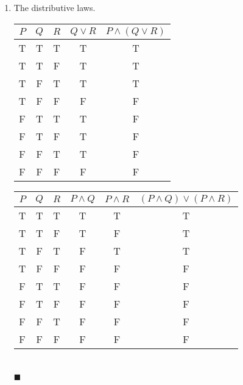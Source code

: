 \documentclass{report}
\newcommand{\qed}{‎\\‎\hfill$\blacksquare$\vspace{1em}}
\begin{document}
\begin{enumerate}[leftmargin=*]
\begin{enumerate}
              \item The distributive laws.
                    \begin{center}
                        \begin{tabular}{ccccc}
                            $P$ & $Q$ & $R$ & $Q \vee R$ & $P \wedge(Q \vee R)$ \\
                            \hline
                            T   & T   & T   & T          & T                    \\
                            T   & T   & F   & T          & T                    \\
                            T   & F   & T   & T          & T                    \\
                            T   & F   & F   & F          & F                    \\
                            F   & T   & T   & T          & F                    \\
                            F   & T   & F   & T          & F                    \\
                            F   & F   & T   & T          & F                    \\
                            F   & F   & F   & F          & F
                        \end{tabular}
                        \hspace{2em}
                        \begin{tabular}{cccccc}
                            $P$ & $Q$ & $R$ & $P \wedge Q$ & $P \wedge R$ & $(P \wedge Q) \vee(P \wedge R)$ \\
                            \hline
                            T   & T   & T   & T            & T            & T                               \\
                            T   & T   & F   & T            & F            & T                               \\
                            T   & F   & T   & F            & T            & T                               \\
                            T   & F   & F   & F            & F            & F                               \\
                            F   & T   & T   & F            & F            & F                               \\
                            F   & T   & F   & F            & F            & F                               \\
                            F   & F   & T   & F            & F            & F                               \\
                            F   & F   & F   & F            & F            & F
                        \end{tabular}
                    \end{center}\qed


\end{enumerate}
\end{enumerate}
\end{document}
